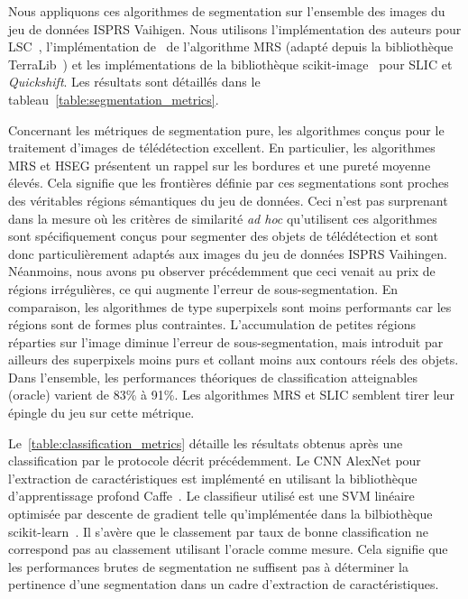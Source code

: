 Nous appliquons ces algorithmes de segmentation sur l'ensemble des images du jeu de données \gls{ISPRS} Vaihigen. Nous utilisons l'implémentation des auteurs pour \gls{LSC}~\cite{li_superpixel_2015}, l'implémentation de~\citet{guyet_extraction_2015} de l'algorithme \gls{MRS} (adapté depuis la bibliothèque TerraLib~\cite{camara_terralib_2008}) et les implémentations de la bibliothèque scikit-image~\cite{van_der_walt_scikit-image_2014} pour \gls{SLIC} et \emph{Quickshift}.
Les résultats sont détaillés dans le tableau~\cref{table:segmentation_metrics}.

Concernant les métriques de segmentation pure, les algorithmes conçus pour le traitement d'images de télédétection excellent. En particulier, les algorithmes \gls{MRS} et \gls{HSEG} présentent un rappel sur les bordures et une pureté moyenne élevés. Cela signifie que les frontières définie par ces segmentations sont proches des véritables régions sémantiques du jeu de données. Ceci n'est pas surprenant dans la mesure où les critères de similarité \emph{ad hoc} qu'utilisent ces algorithmes sont spécifiquement conçus pour segmenter des objets de télédétection et sont donc particulièrement adaptés aux images du jeu de données \gls{ISPRS} Vaihingen. Néanmoins, nous avons pu observer précédemment que ceci venait au prix de régions irrégulières, ce qui augmente l'erreur de sous-segmentation. En comparaison, les algorithmes de type superpixels sont moins performants car les régions sont de formes plus contraintes. L'accumulation de petites régions réparties sur l'image diminue l'erreur de sous-segmentation, mais introduit par ailleurs des superpixels moins purs et collant moins aux contours réels des objets. Dans l'ensemble, les performances théoriques de classification atteignables (oracle) varient de 83\% à 91\%. Les algorithmes \gls{MRS} et \gls{SLIC} semblent tirer leur épingle du jeu sur cette métrique.

Le~\cref{table:classification_metrics} détaille les résultats obtenus après une classification par le protocole décrit précédemment. Le \gls{CNN} AlexNet pour l'extraction de caractéristiques est implémenté en utilisant la bibliothèque d'apprentissage profond Caffe~\cite{jia_caffe_2014}. Le classifieur utilisé est une \gls{SVM} linéaire optimisée par descente de gradient telle qu'implémentée dans la bilbiothèque scikit-learn~\cite{pedregosa_scikit-learn_2011}.
Il s'avère que le classement par taux de bonne classification ne correspond pas au classement utilisant l'oracle comme mesure. Cela signifie que les performances brutes de segmentation ne suffisent pas à déterminer la pertinence d'une segmentation dans un cadre d'extraction de caractéristiques.

